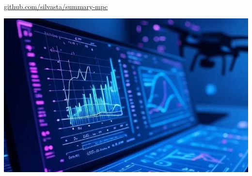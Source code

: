 
\begin{center}
	\colorbox{RoyalBlue}{\textcolor{white}
		{}}
	\colorbox{lightgray}{\textcolor{Black}
		{}}
	\footnotesize{
		\url{github.com/silvasta/summary-mpc}}

	\includegraphics[width=\columnwidth]{images/header-1.jpg}

\end{center}




